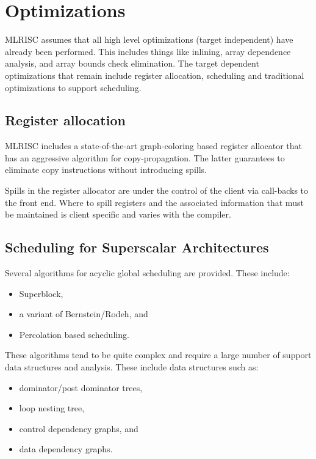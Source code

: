 \section{Optimizations}

  MLRISC assumes that all high level optimizations (target
  independent) have already been performed. This includes things like
  inlining, array dependence analysis, and array bounds check
  elimination.  The target dependent optimizations that remain include
  register allocation, scheduling and traditional optimizations to
  support scheduling. 

\subsection{Register allocation}
  
  MLRISC includes a state-of-the-art graph-coloring based register
  allocator that has an aggressive algorithm for copy-propagation. The
  latter guarantees to eliminate copy instructions without introducing
  spills.

   Spills in the register allocator are under the control of the
client via call-backs to the front end. Where to spill registers and
the associated information that must be maintained is client specific
and varies with the compiler. 

\subsection{Scheduling for Superscalar Architectures}
  Several algorithms for acyclic global scheduling are provided. These
include:

  \begin{itemize}
    \item Superblock,
    \item a variant of Bernstein/Rodeh, and
    \item Percolation based scheduling.
  \end{itemize}

These algorithms tend to be quite complex and require a large number
of support data structures and analysis. These include data structures
such as:

  \begin{itemize}
    \item dominator/post dominator trees,
    \item loop nesting tree,
    \item control dependency graphs, and 
    \item data dependency graphs.
 \end{itemize}

